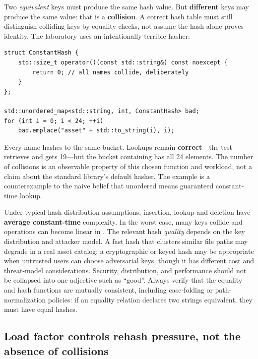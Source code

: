 Two \emph{equivalent} keys must produce the same hash value. But \textbf{different} keys may produce the same value: that is a \textbf{collision}. A correct hash table must still distinguish colliding keys by equality checks, not assume the hash alone proves identity. The laboratory uses an intentionally terrible hasher:

\begin{verbatim}
struct ConstantHash {
    std::size_t operator()(const std::string&) const noexcept {
        return 0; // all names collide, deliberately
    }
};

std::unordered_map<std::string, int, ConstantHash> bad;
for (int i = 0; i < 24; ++i)
    bad.emplace("asset" + std::to_string(i), i);
\end{verbatim}

Every name hashes to the same bucket. Lookups remain \textbf{correct}---the test retrieves  and gets 19---but the bucket containing  has all 24 elements. The number of collisions is an observable property of this chosen function and workload, not a claim about the standard library's default hasher. The example is a counterexample to the naive belief that unordered means guaranteed constant-time lookup.

Under typical hash distribution assumptions, insertion, lookup and deletion have \textbf{average constant-time} complexity. In the worst case, many keys collide and operations can become linear in . The relevant hash \emph{quality} depends on the key distribution and attacker model. A fast hash that clusters similar file paths may degrade in a real asset catalog; a cryptographic or keyed hash may be appropriate when untrusted users can choose adversarial keys, though it has different cost and threat-model considerations. Security, distribution, and performance should not be collapsed into one adjective such as ``good''. Always verify that the equality and hash functions are mutually consistent, including case-folding or path-normalization policies: if an equality relation declares two strings equivalent, they must have equal hashes.

\subsection{Load factor controls rehash pressure, not the absence of collisions}\label{05-engine-i-ch005-load-factor-controls-rehash-pressure-not-the-absence-of-collisions}

